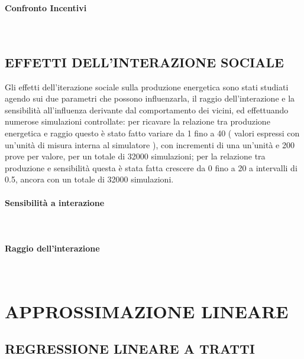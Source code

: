 \documentclass[12pt,a4paper,openright,twoside]{report}
\newcommand{\myparagraph}[1]{\paragraph{#1}\mbox{}\\}
\begin{document}
\myparagraph{Confronto Incentivi}

\subsection{EFFETTI DELL'INTERAZIONE SOCIALE}

Gli effetti dell'iterazione sociale sulla produzione energetica sono stati studiati agendo sui due parametri che possono influenzarla, il raggio dell'interazione e la sensibilità all'influenza derivante dal comportamento dei vicini, ed effettuando numerose simulazioni controllate: per ricavare la relazione tra produzione energetica e raggio questo è stato fatto variare da 1 fino a 40 ( valori espressi con un'unità di misura interna al simulatore ), con incrementi di una un'unità e 200 prove per valore, per un totale di 32000 simulazioni; per la relazione tra produzione e sensibilità questa è stata fatta crescere da 0 fino a 20 a intervalli di 0.5, ancora con un totale di 32000 simulazioni.

\myparagraph{Sensibilità a interazione}

\myparagraph{Raggio dell'interazione}


\section[APPROSSIMAZIONE LINEARE]{APPROSSIMAZIONE LINEARE}

\subsection{REGRESSIONE LINEARE A TRATTI}


\nocite{*}


\end{document}
